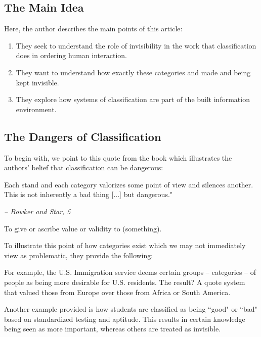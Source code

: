 \documentclass[openany]{book}
\begin{document}
\subsection{The Main Idea}
Here, the author describes the main points of this article:
\begin{enumerate}
	\item They seek to understand the role of invisibility in the work that classification does in ordering human interaction.
	\item They want to understand how exactly these categories and made and being kept invisible.
	\item They explore how systems of classification are part of the built information environment.
\end{enumerate}

\subsection{The Dangers of Classification}
To begin with, we point to this quote from the book which illustrates the authors' belief that classification can be dangerous:

\begin{fancyquotes}
	Each stand and each category valorizes some point of view and silences another. This is not inherently a bad thing [...] but dangerous."
	
	\begin{flushright}
		\emph{\textit{-- Bowker and Star, 5}}
	\end{flushright}
\end{fancyquotes}

\begin{defn}[Valorize]
	To give or ascribe value or validity to (something).
\end{defn}
To illustrate this point of how categories exist which we may not immediately view as problematic, they provide the following:

\begin{example}
	For example, the U.S. Immigration service deems certain groups -- categories -- of people as being more desirable for U.S. residents. The result? A quote system that valued those from Europe over those from Africa or South America.
	
	Another example provided is how students are classified as being ``good" or ``bad" based on standardized testing and aptitude. This results in certain knowledge being seen as more important, whereas others are treated as invisible.
\end{example}
\end{document}
